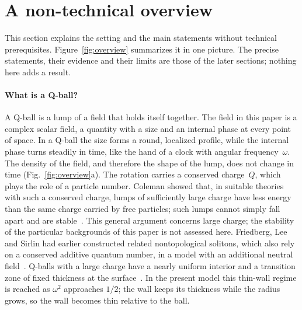 \section{A non-technical overview}\label{sec:overview}
This section explains the setting and the main statements without
technical prerequisites. Figure~\ref{fig:overview} summarizes it in one
picture. The precise statements, their evidence and their limits are
those of the later sections; nothing here adds a result.

\paragraph{What is a Q-ball?}
A Q-ball is a lump of a field that holds itself together. The field in
this paper is a complex scalar field, a quantity with a size and an
internal phase at every point of space. In a Q-ball the size forms a
round, localized profile, while the internal phase turns steadily in
time, like the hand of a clock with angular frequency~$\omega$. The
density of the field, and therefore the shape of the lump, does not
change in time (Fig.~\ref{fig:overview}a). The rotation carries a
conserved charge~$Q$, which plays the role of a particle number.
Coleman showed that, in suitable theories with such a conserved charge,
lumps of sufficiently large charge have less energy than the same charge
carried by free particles; such lumps cannot simply fall apart and are
stable~\cite{Coleman1985}. This general argument concerns large charge;
the stability of the particular backgrounds of this paper is not
assessed here. Friedberg, Lee and Sirlin had earlier constructed related
nontopological solitons, which also rely on a conserved additive quantum
number, in a model with an additional neutral
field~\cite{FriedbergLeeSirlin1976}. Q-balls with a large charge have a
nearly uniform interior and a transition zone of fixed thickness at the
surface~\cite{Coleman1985}. In the present model this thin-wall regime
is reached as $\omega^2$ approaches $1/2$; the wall keeps its thickness
while the radius grows, so the wall becomes thin relative to the ball.

